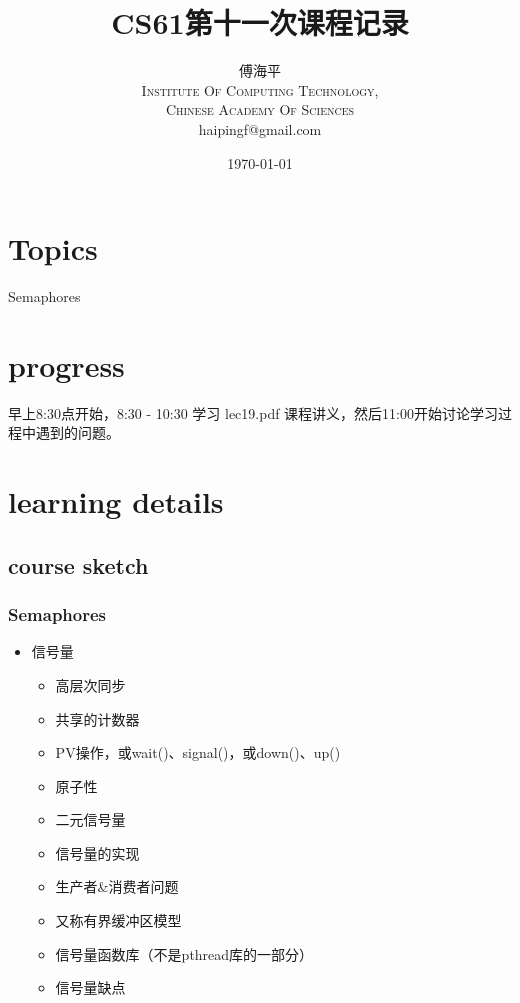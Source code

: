 \documentclass[a4paper, 11pt]{article}
\title{CS61第十一次课程记录}
\author{傅海平\\
\textsc{Institute Of Computing Technology,}\\
\textsc{Chinese Academy Of Sciences}\\
haipingf@gmail.com\\
}
\date{\today}
\begin{document}
\maketitle
\newpage
\tableofcontents
\newpage
\section{Topics}
\begin{center}
  \Large{Semaphores}
\end{center}

\section{progress}
早上8:30点开始，8:30 - 10:30 学习 lec19.pdf 课程讲义，然后11:00开始讨论学习过程中遇到的问题。
\section{learning details}
\subsection{course sketch}
\subsubsection{Semaphores}
\begin{itemize}
  \item{信号量}
	\begin{itemize}
	  \item{高层次同步}
	  \item{共享的计数器}
	  \item{PV操作，或wait()、signal()，或down()、up()}
	  \item{原子性}
	  \item{二元信号量}
	  \item{信号量的实现}
	  \item{生产者\&消费者问题}
	  \item{又称有界缓冲区模型}
	  \item{信号量函数库（不是pthread库的一部分）}
	  \item{信号量缺点}
	  \end{itemize}
  \end{itemize}
\end{document}
